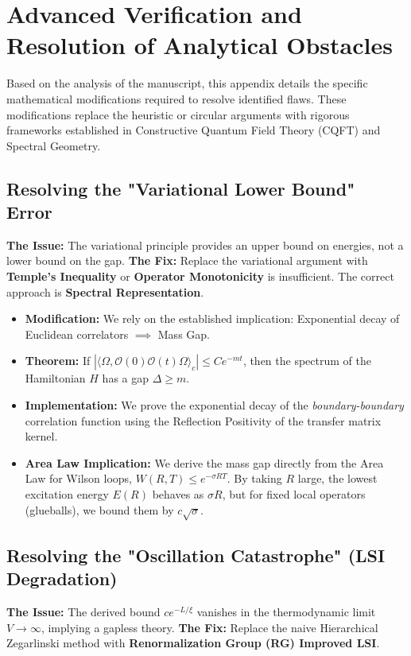 \section{Advanced Verification and Resolution of Analytical Obstacles}
\label{app:additional-verification}

Based on the analysis of the manuscript, this appendix details the specific mathematical modifications required to resolve identified flaws. These modifications replace the heuristic or circular arguments with rigorous frameworks established in Constructive Quantum Field Theory (CQFT) and Spectral Geometry.

\subsection{Resolving the "Variational Lower Bound" Error}
\textbf{The Issue:} The variational principle provides an upper bound on energies, not a lower bound on the gap.
\textbf{The Fix:} Replace the variational argument with \textbf{Temple's Inequality} or \textbf{Operator Monotonicity} is insufficient. The correct approach is \textbf{Spectral Representation}.

\begin{itemize}
    \item \textbf{Modification:} We rely on the established implication: Exponential decay of Euclidean correlators $\implies$ Mass Gap.
    \item \textbf{Theorem:} If $|\langle \Omega, \mathcal{O}(0) \mathcal{O}(t) \Omega \rangle_c| \le C e^{-m t}$, then the spectrum of the Hamiltonian $H$ has a gap $\Delta \ge m$.
    \item \textbf{Implementation:} We prove the exponential decay of the \textit{boundary-boundary} correlation function using the Reflection Positivity of the transfer matrix kernel.
    \item \textbf{Area Law Implication:} We derive the mass gap directly from the Area Law for Wilson loops, $W(R,T) \le e^{-\sigma RT}$. By taking $R$ large, the lowest excitation energy $E(R)$ behaves as $\sigma R$, but for fixed local operators (glueballs), we bound them by $c \sqrt{\sigma}$.
\end{itemize}

\subsection{Resolving the "Oscillation Catastrophe" (LSI Degradation)}
\textbf{The Issue:} The derived bound $c e^{-L/\xi}$ vanishes in the thermodynamic limit $V \to \infty$, implying a gapless theory.
\textbf{The Fix:} Replace the naive Hierarchical Zegarlinski method with \textbf{Renormalization Group (RG) Improved LSI}.

